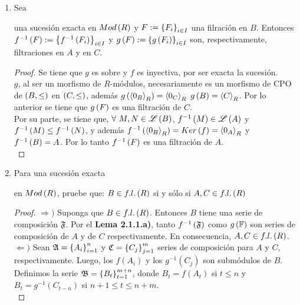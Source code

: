 \documentclass{article}
\begin{document}
\begin{enumerate}[label=\textbf{Ej \arabic*.}]
\item Sea
\begin{center}
\end{center}
una sucesión exacta en $Mod\left(R\right)$ y $F:={\left\{{F}_{i}\right\}}_{i\in I}$ una filración en $B$. Entonces $f^{-1}\left(F\right):=\left\{f^{-1}\left(F_i\right)\right\}_{i\in I}$ y $g\left(F\right):=\left\{g\left(F_i\right)\right\}_{i\in I}$ son, respectivamente, filtraciones en $A$ y en $C$.
\begin{proof}
	Se tiene que $g$ es sobre y $f$ es inyectiva, por ser exacta la sucesión.\\
	$g$, al ser un morfismo de $R$-módulos, necesariamente es un morfismo de CPO de $\left(B,\leq\right)$ en $\left(C,\leq\right)$, además $g\left(\left< 0_B\right>_{R}\right)=\left< 0_C\right>_{R}$ $g\left(B\right)=\left< C\right>_{R}$. Por lo anterior se tiene que $g\left(F\right)$ es una filtración de $C$.\\
	Por su parte, se tiene  que, $\forall\ M,N\in\genlin{B}$,  $f^{-1}\left(M\right)\in\mathscr{L}\left(A\right)$ y $f^{-1}\left(M\right)\leq f^{-1}\left(N\right)$,  y además $f^{-1}\left(\left< 0_B\right>_{R}\right)=Ker\left(f\right)=\left< 0_A\right>_{R}$ y $f^{-1}\left(B\right)=A$. Por lo tanto $f^{-1}\left(F\right)$ es una filtración de $A$.\\
\end{proof}
\item %
Para una sucesión exacta
en $Mod\left(R\right)$, pruebe que: $B \in f.l.\left(R\right)$ si y sólo si $A,C \in f.l.\left(R\right)$
\begin{proof}
	$\boxed{\Rightarrow )}$ Suponga que $B \in f.l.\left(R\right)$. Entonces $B$ tiene una serie de composición $\mathfrak{F}$. Por el \textbf{Lema 2.1.1.a)}, tanto $f^{-1}\left(\mathfrak{F}\right)$ como $g\left(\mathbb{F}\right)$ son series de composición de $A$ y de $C$ respectivamente. En consecuencia, $A,C \in f.l.\left(R\right)$.\\
	
	$\boxed{\Leftarrow )}$ Sean $\mathfrak{A}={\left\{{A}_{i}\right\}}_{i=1}^{n}$ y $\mathfrak{C}={\left\{{C}_{j}\right\}}_{j=1}^{m}$ series de composición para $A$ y $C$, respectivamente. Luego, los $f(A_{i})$ y los $g^{-1}(C_{j})$ son submódulos de $B$. Definimos la serie $\mathfrak{B}={\left\{{B}_{t}\right\}}_{t=1}^{m+n}$, donde $B_{t}=f(A_{t})$ si $t \leq n$ y $B_{t}=g^{-1}(C_{t-n})$ si $n+1 \leq t \leq n+m$.\\
	

\end{proof}
\end{enumerate}
\end{document}
